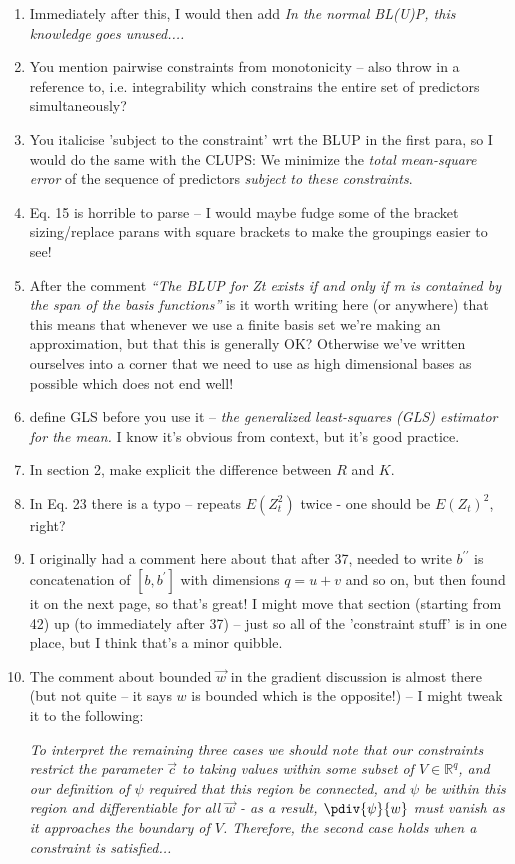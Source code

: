 \documentclass[]{article}
\begin{document}
\begin{enumerate}
			\item Immediately after this, I would then add {\it {\color{red}In the normal BL(U)P, t}his knowledge goes unused....}
			\item You mention pairwise constraints from monotonicity -- also throw in a reference to, i.e. integrability which constrains the entire set of predictors simultaneously?
			\item You italicise 'subject to the constraint' wrt the BLUP in the first para, so I would do the same with the CLUPS: We minimize the \textit{total mean-square error} of the sequence of predictors \textit{\color{red}subject to these constraints}. 
			\item Eq. 15 is horrible to parse -- I would maybe fudge some of the bracket sizing/replace parans with square brackets to make the groupings easier to see!
			\item After the comment {\it``The BLUP for Zt exists if and only if m is contained by the span of the basis functions''} is it worth writing here (or anywhere) that this means that whenever we use a finite basis set we're making an approximation, but that this is generally OK? Otherwise we've written ourselves into a corner that we need to use as high dimensional bases as possible which does not end well!
			\item define GLS before you use it -- {\it the generalized least-squares (GLS) estimator for the mean.} I know it's obvious from context, but it's good practice.
			\item In section 2, make explicit the difference between $R$ and $K$. 
			\item In Eq. 23 there is a typo -- repeats $E(Z_t^2)$ twice - one should be $E(Z_t)^2$, right?
			\item I originally had a comment here about that after 37, needed to write $b^{\prime \prime}$ is concatenation of $[b,b^\prime]$ with dimensions $q = u + v$ and so on, but then found it on the next page, so that's great! I might move that section (starting from 42) up (to immediately after 37) -- just so all of the 'constraint stuff' is in one place, but I think that's a minor quibble.
			\item The comment about bounded $\vec{w}$ in the gradient discussion is almost there (but not quite -- it says $w$ is bounded which is the opposite!) -- I might tweak it to the following:
			
			{\it To interpret the remaining three cases we should note that our constraints restrict the
			parameter {\color{red} $\vec{c}$ to taking values within some subset of $V \in \mathbb{R}^q$, and our definition of $\psi$ required that this region be connected, and $\psi$ be within this region and differentiable for all $\vec{w}$ - as a result, $\pdiv{\psi}{w}$ must vanish as it approaches the boundary of $V$.  Therefore, the} second case holds when a constraint is satisfied...}


\end{enumerate}
\end{document}

